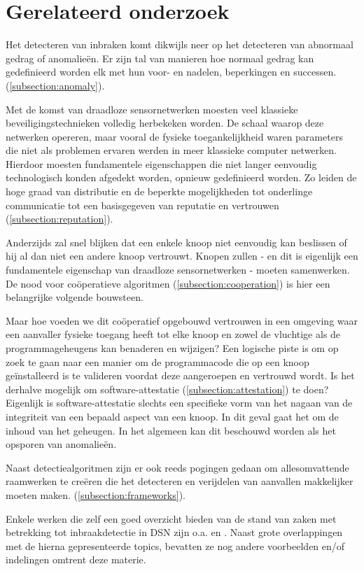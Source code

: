 \section{Gerelateerd onderzoek}
\label{section:related}

Het detecteren van inbraken komt dikwijls neer op het detecteren van abnormaal
gedrag of anomalie\"en. Er zijn tal van manieren hoe normaal gedrag kan
gedefinieerd worden elk met hun voor- en nadelen, beperkingen en successen.
(\ref{subsection:anomaly}).

Met de komst van draadloze sensornetwerken moesten veel klassieke
beveiligingstechnieken volledig herbekeken worden. De schaal waarop deze
netwerken opereren, maar vooral de fysieke toegankelijkheid waren parameters
die niet als problemen ervaren werden in meer klassieke computer netwerken.
Hierdoor moesten fundamentele eigenschappen die niet langer eenvoudig
technologisch konden afgedekt worden, opnieuw gedefinieerd worden. Zo leiden de
hoge graad van distributie en de beperkte mogelijkheden tot onderlinge
communicatie tot een basisgegeven van reputatie en vertrouwen
(\ref{subsection:reputation}).

Anderzijds zal snel blijken dat een enkele knoop niet eenvoudig kan beslissen
of hij al dan niet een andere knoop vertrouwt. Knopen zullen - en dit is
eigenlijk een fundamentele eigenschap van draadloze sensornetwerken - moeten
samenwerken. De nood voor co\"operatieve algoritmen
(\ref{subsection:cooperation}) is hier een belangrijke volgende bouwsteen.

Maar hoe voeden we dit co\"operatief opgebouwd vertrouwen in een omgeving waar
een aanvaller fysieke toegang heeft tot elke knoop en zowel de vluchtige als de
programmageheugens kan benaderen en wijzigen? Een logische piste is om op zoek
te gaan naar een manier om de programmacode die op een knoop ge\"installeerd is
te valideren voordat deze aangeroepen en vertrouwd wordt. Is het derhalve
mogelijk om software-attestatie (\ref{subsection:attestation}) te doen?
Eigenlijk is software-attestatie slechts een specifieke vorm van het nagaan van
de integriteit van een bepaald aspect van een knoop. In dit geval gaat het om
de inhoud van het geheugen. In het algemeen kan dit beschouwd worden als het
opsporen van anomalie\"en.

Naast detectiealgoritmen zijn er ook reeds pogingen gedaan om allesomvattende
raamwerken te cre\"eren die het detecteren en verijdelen van aanvallen
makkelijker moeten maken. (\ref{subsection:frameworks}).

Enkele werken die zelf een goed overzicht bieden van de stand van zaken met
betrekking tot inbraakdetectie in DSN zijn o.a. \citep{mishra2004intrusion} en
\citep{alrajeh2013intrusion}. Naast grote overlappingen met de hierna
gepresenteerde topics, bevatten ze nog andere voorbeelden en/of indelingen
omtrent deze materie.






